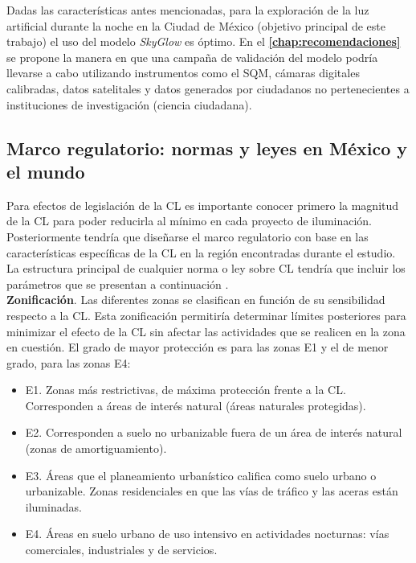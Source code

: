 Dadas las características antes mencionadas, para la exploración de la luz artificial durante la noche en la Ciudad de México (objetivo principal de este trabajo) el uso del modelo \textit{SkyGlow} es óptimo. En el  \textbf{\autoref{chap:recomendaciones}} se propone la manera en que una campaña de validación del modelo podría llevarse a cabo utilizando instrumentos como el SQM, cámaras digitales calibradas, datos satelitales y datos generados por ciudadanos no pertenecientes a instituciones de investigación (ciencia ciudadana).\\

\newpage

\subsection{Marco regulatorio: normas y leyes en México y el mundo}

Para efectos de legislación de la CL es importante conocer primero la magnitud de la CL para poder reducirla al mínimo en cada proyecto de iluminación. Posteriormente tendría que diseñarse el marco regulatorio con base en las características específicas de la CL en la región encontradas durante el estudio. La estructura principal de cualquier norma o ley sobre CL tendría que incluir los parámetros que se presentan a continuación \citep{LibroCL}.\\


\textbf{Zonificación}.
Las diferentes zonas se clasifican en función de su sensibilidad respecto a la CL. Esta zonificación permitiría determinar límites posteriores para minimizar el efecto de la CL sin afectar las actividades que se realicen en la zona en cuestión. El grado de mayor protección es para las zonas E1 y el de menor grado, para las zonas E4:

\begin{itemize}

    \item E1. Zonas más restrictivas, de máxima protección frente a la CL. Corresponden a áreas de interés natural (áreas naturales protegidas).
    
    \item E2. Corresponden a suelo no urbanizable fuera de un área de interés natural (zonas de amortiguamiento).
    
    \item E3. Áreas que el planeamiento urbanístico califica como suelo urbano o urbanizable. Zonas residenciales en que las vías de tráfico y las aceras están iluminadas.
    
    \item E4. Áreas en suelo urbano de uso intensivo en actividades nocturnas: vías comerciales, industriales y de servicios.
     
\end{itemize}


